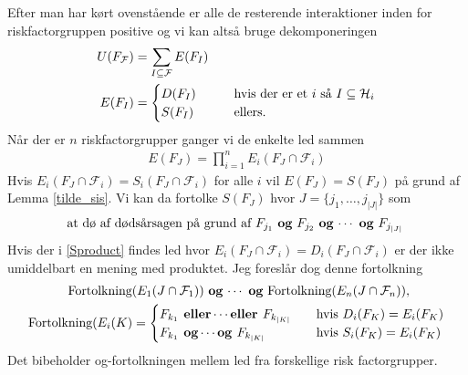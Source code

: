 \documentclass[a4paper, 12pt]{article}
\begin{document}
Efter man har kørt ovenstående er alle de resterende interaktioner inden for riskfactorgruppen positive og vi kan altså bruge dekomponeringen
\begin{align}
U(F_{\mathcal F})&=\sum_{I\subseteq \mathcal F} E(F_I)\\
E(F_I)&=\begin{cases}
D(F_I) \qquad & \textup{hvis der er et $i$ så } I\subseteq \mathcal H_i\\
S(F_I) \qquad & \textup{ellers.}
\end{cases}
\end{align}
Når der er $n$ riskfactorgrupper ganger vi de enkelte led sammen
\begin{align}
E(F_J)=\prod_{i=1}^nE_i(F_J\cap \mathcal F_i)\label{Sproduct}
\end{align}
Hvis $E_i(F_J\cap \mathcal F_i)=S_i(F_J\cap \mathcal F_i)$ for alle $i$ vil $E(F_J)=S(F_J)$ på grund af Lemma \ref{tilde_sis}. Vi kan da fortolke $S(F_J)$ hvor $J=\{j_1, \dots, j_{|J|}\}$ som
\begin{equation}
\textup{at dø af dødsårsagen på grund af $F_{j_1}$ \textbf{og} $F_{j_2}$ \textbf{og} $\cdots$ \textbf{og} $F_{j_{|J|}}$ }
\end{equation}
Hvis der i \eqref{Sproduct} findes led hvor $E_i(F_J\cap \mathcal F_i)=D_i(F_J\cap \mathcal F_i)$ er der ikke umiddelbart en mening med produktet. Jeg foreslår dog denne fortolkning
\begin{gather}
\textup{ Fortolkning($E_1(J\cap \mathcal F_1)$) \textbf{og} $\cdots$ \textbf{og} Fortolkning($E_n(J\cap \mathcal F_n)$)},\\
\textup{Fortolkning}(E_i(K)=\begin{cases}
F_{k_1} \textbf{ eller}\cdots \textbf{eller } F_{k_{|K|}} \quad &\textup{hvis } D_i(F_K)=E_i(F_K)\\
F_{k_1} \textbf{ og}\cdots \textbf{og } F_{k_{|K|}} \quad &\textup{hvis } S_i(F_K)=E_i(F_K)\\
\end{cases}
\end{gather}
Det bibeholder og-fortolkningen mellem led fra forskellige risk factorgrupper.
\end{document}
